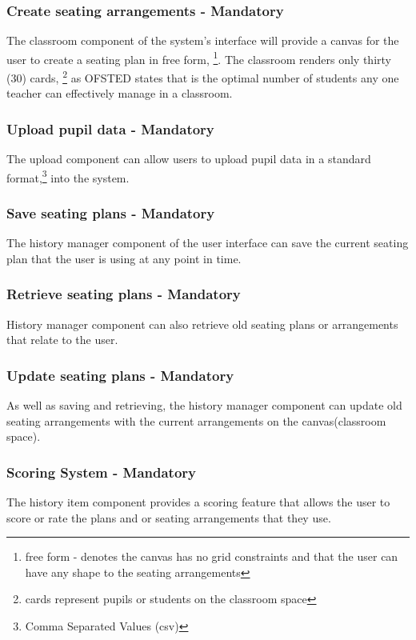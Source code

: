 \subsubsection{Create seating arrangements - Mandatory}
The classroom component of the system's interface will provide a canvas for the user to create a seating plan in free form, \footnote{free form - denotes the canvas has no grid constraints and that the user can have any shape to the seating arrangements}. The classroom renders only thirty (30) cards, \footnote{cards represent pupils or students on the classroom space} as OFSTED \cite{OFSTED} states that is the optimal number of students any one teacher can effectively manage in a classroom.

\subsubsection{Upload pupil data - Mandatory}
The upload component can allow users to upload pupil data in a standard format,\footnote{Comma Separated Values (csv)} into the system.

\subsubsection{Save seating plans - Mandatory}
The history manager component of the user interface can save the current seating plan that the user is using at any point in time.

\subsubsection{Retrieve seating plans - Mandatory}
History manager component can also retrieve old seating plans or arrangements that relate to the user.

\subsubsection{Update seating plans - Mandatory}   
As well as saving and retrieving, the history manager component can update old seating arrangements with the current arrangements on the canvas(classroom space).

\subsubsection{Scoring System - Mandatory}
The history item component provides a scoring feature that allows the user to score or rate the plans and or seating arrangements that they use.

